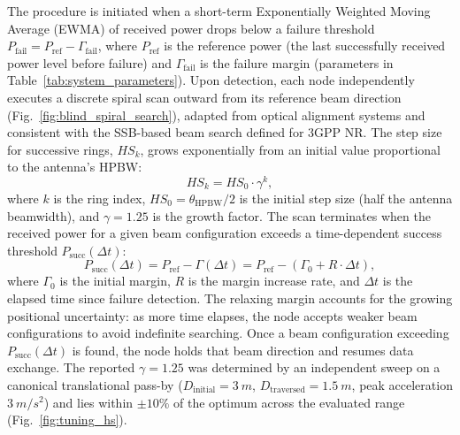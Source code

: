 \documentclass[fleqn,10pt]{wlscirep}
\newcommand{\rev}[1]{{\color{revblue}#1}}
\begin{document}
The procedure is initiated when a short-term Exponentially Weighted Moving Average (EWMA) of received power drops below a failure threshold $P_{\text{fail}} = P_{\text{ref}} - \Gamma_{\text{fail}}$, where $P_{\text{ref}}$ is the reference power (the last successfully received power level before failure) and $\Gamma_{\text{fail}}$ is the failure margin (parameters in Table~\ref{tab:system_parameters}). Upon detection, each node independently executes a discrete spiral scan outward from its reference beam direction (Fig.~\ref{fig:blind_spiral_search}), adapted from optical alignment systems\cite{photonics11060540} \rev{and consistent with the SSB-based beam search defined for 3GPP NR\cite{Giordani2018ATO, Heng2021SixChallenges}}. The step size for successive rings, $HS_k$, grows exponentially from an initial value proportional to the antenna's HPBW:
\begin{equation}
    HS_k = HS_0 \cdot \gamma^k,
\end{equation}
where $k$ is the ring index, $HS_0 = \theta_{\text{HPBW}}/2$ is the initial step size (half the antenna beamwidth), and $\gamma = 1.25$ is the growth factor. The scan terminates when the received power for a given beam configuration exceeds a time-dependent success threshold $P_{\text{succ}}(\Delta t)$:
\begin{equation}
    P_{\text{succ}}(\Delta t) = P_{\text{ref}} - \Gamma(\Delta t) = P_{\text{ref}} - (\Gamma_{0} + R \cdot \Delta t),
\end{equation}
where $\Gamma_{0}$ is the initial margin, $R$ is the margin increase rate, and $\Delta t$ is the elapsed time since failure detection. The relaxing margin accounts for the growing positional uncertainty: as more time elapses, the node accepts weaker beam configurations to avoid indefinite searching. Once a beam configuration exceeding $P_{\text{succ}}(\Delta t)$ is found, the node holds that beam direction and resumes data exchange. \rev{The reported $\gamma = 1.25$ was determined by an independent sweep on a canonical translational pass-by ($D_{\text{initial}} = \SI{3}{m}$, $D_{\text{traversed}} = \SI{1.5}{m}$, peak acceleration $\SI{3}{m/s^2}$) and lies within $\pm 10\%$ of the optimum across the evaluated range (Fig.~\ref{fig:tuning_hs}).}
\end{document}
